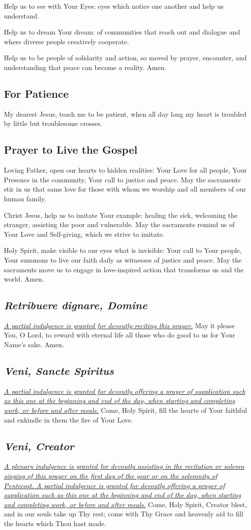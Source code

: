 \documentclass[12pt]{article}
\newcommand{\prayertitle}[1]{\subsection{#1}}
\newcommand{\indulgencedprayertitle}[1]{\prayertitle{#1 \protect\kreuz}}
\newcommand{\emphasis}[1]{\emph{#1}}
\newcommand{\emphasis}[1]{\textsl{#1}}
\newcommand{\foreign}[1]{\emphasis{#1}}
\newcommand{\note}[1]{{\small{\emphasis{#1}}}\newline}
\newcommand{\linkednote}[2]{\hyperlink{#1}{\note{#2}}}
\begin{document}
Help us to see with Your Eyes:
eyes which notice one another and help us understand.

Help us to dream Your dream:
of communities that reach out and dialogue and where diverse people creatively cooperate.

Help us to be people of solidarity and action, so moved by prayer, encounter, and understanding that peace can become a reality.
Amen.

\prayertitle{For Patience}
My dearest Jesus, teach me to be patient, when all day long my heart is troubled by little but troublesome crosses.

\prayertitle{Prayer to Live the Gospel}
Loving Father, open our hearts to hidden realities:
Your Love for all people,
Your Presence in the community,
Your call to justice and peace.
May the sacraments stir in us
that same love for those with whom we worship and all members of our human family.

Christ Jesus, help us to imitate Your example:
healing the sick,
welcoming the stranger,
assisting the poor and vulnerable.
May the sacraments remind us
of Your Love and Self-giving,
which we strive to imitate.

Holy Spirit, make visible to our eyes what is invisible:
Your call to Your people,
Your summons to live our faith daily
as witnesses of justice and peace.
May the sacraments move us to engage in love-inspired action that transforms us and the world.
Amen.

\indulgencedprayertitle{\foreign{Retribuere dignare, Domine}}
\linkednote{grant24}{A partial indulgence is granted for devoutly reciting this prayer.}
May it please You, O Lord, to reward with eternal life all those who do good to us for Your Name's sake. Amen.

\indulgencedprayertitle{\foreign{Veni, Sancte Spiritus}}
\linkednote{grant26}{A partial indulgence is granted for devoutly offering a prayer of supplication such as this one at the beginning and end of the day, when starting and completing work, or before and after meals.}
Come, Holy Spirit, fill the hearts of Your faithful and enkindle in them the fire of Your Love.

\indulgencedprayertitle{\foreign{Veni, Creator}}
\linkednote{grant26}{A plenary indulgence is granted for devoutly assisting in the recitation or solemn singing of this prayer on the first day of the year or on the solemnity of Pentecost.
A partial indulgence is granted for devoutly offering a prayer of supplication such as this one at the beginning and end of the day, when starting and completing work, or before and after meals.}
Come, Holy Spirit, Creator blest,
and in our souls take up Thy rest;
come with Thy Grace and heavenly aid
to fill the hearts which Thou hast made.
\end{document}
